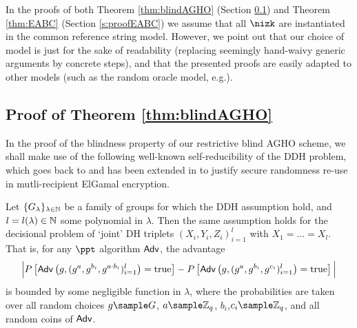 In the proofs of both Theorem \ref{thm:blindAGHO} (Section \ref{s:proofAGHO}) and Theorem \ref{thm:EABC} (Section \ref{s:proofEABC}) we assume that all $\nizk$ are instantiated in the common reference string model. 
However, we point out that our choice of model is just for the sake of readability (replacing seemingly hand-waivy generic arguments by concrete steps), and that the presented proofs are easily adapted to other models (such as the random oracle model, e.g.).


\subsection{Proof of Theorem \ref{thm:blindAGHO}}
\label{s:proofAGHO}


In the proof of the blindness property of our restrictive blind AGHO scheme, we shall make use of the following well-known self-reducibility of the DDH problem, which goes back to \cite{Stadler:1996} and has been extended in \cite{Bellare:2000} to justify secure randomness re-use in mutli-recipient ElGamal encryption.
\begin{lemma}
\label{lem:DDH}
Let $\{G_\lambda\}_{\lambda\in\operatorname{\mathbb{N}}}$ be a family of groups for which the DDH assumption hold, and   $l=l(\lambda)\in\operatorname{\mathbb{N}}$  some 
polynomial in $\lambda$.
Then the same assumption holds for the decisional problem of  `joint' DH triplets $(X_i,Y_i,Z_i)_{i=1}^l$ with $X_1=\ldots = X_l$.
That is, for any $\ppt$ algorithm $\mathsf{Adv}$, the advantage
\begin{multline*}
\Big| P\left[\mathsf{Adv}\left(g, (g^a, g^{b_i}, g^{a\cdot b_i})_{i=1}^l\right)= \text{true} \right]  
-
P\left[\mathsf{Adv}\left(g, (g^a, g^{b_i}, g^{c_i})_{i=1}^l\right)= \text{true} \right] \Big| 
\end{multline*}
is bounded by some negligible function in $\lambda$, where  
the probabilities are taken over all random choices $g\sample G$, $a\sample\Z_q$, $b_i$,$c_i\sample\Z_q$, and all random coins of $\mathsf{Adv}$.
\end{lemma}


